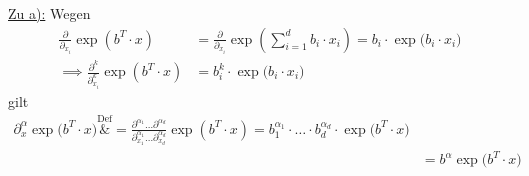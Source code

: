 \documentclass[12pt,a4paper]{article}
\begin{document}
\begin{lösung}
	\underline{Zu a):}
	Wegen
	\begin{align*}
		\frac{\partial}{\partial_{x_i}}\exp(b^T\cdot x)
		&=\frac{\partial}{\partial_{x_i}}\exp\left(\sum\limits_{i=1}^d b_i\cdot x_i\right)
		=b_i\cdot\exp\big(b_i\cdot x_i\big)\\
		\implies\frac{\partial^k}{\partial_{x_i}^k}\exp(b^T\cdot x)
		&=b_i^k\cdot\exp\big(b_i\cdot x_i\big)
	\end{align*}
	gilt
	\begin{align*}
		\partial_x^\alpha\exp\big(b^T\cdot x\big)
		\overset{\text{Def}}&{=}
		\frac{\partial^{\alpha_1}\ldots\partial^{\alpha_d}}{\partial_{x_1}^{\alpha_1}\ldots\partial_{x_d}^{\alpha_d}}\exp(b^T\cdot x)
		=b_1^{\alpha_1}\cdot\ldots\cdot b_d^{\alpha_d}\cdot\exp\big(b^T\cdot x\big)\\
		&=b^\alpha \exp\big(b^T\cdot x\big)
	\end{align*}
	

\end{lösung}
\end{document}
